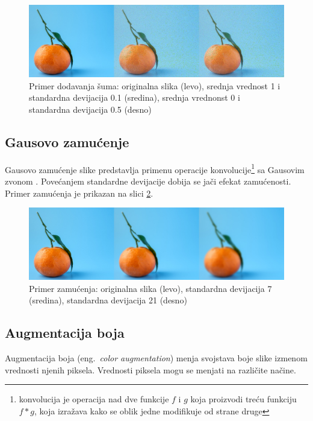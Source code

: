 \documentclass[12pt,oneside]{memoir}
\begin{document}
\begin{figure}[ht]
    \centering
    \includegraphics[width=1\textwidth]{matfmaster/glava3/noise.jpg}
    \caption{Primer dodavanja šuma:  originalna slika (levo), srednja vrednost 1 i standardna devijacija 0.1 (sredina), srednja vrednonst 0 i standardna devijacija 0.5 (desno) \cite{unsplashOrange}}
    \label{fig:section3_noise}
\end{figure}

\subsection{Gausovo zamućenje}
Gausovo zamućenje slike predstavlja primenu operacije konvolucije\footnote{konvolucija je operacija nad dve funkcije \(f\) i \(g\) koja proizvodi treću funkciju \(f*g\), koja izražava kako se oblik jedne modifikuje od strane druge} sa Gausovim zvonom \cite{ni2019}.
Povećanjem standardne devijacije dobija se jači efekat zamućenosti. Primer zamućenja je prikazan na slici \ref{fig:section3_blur}.


\begin{figure}[ht]
    \centering
    \includegraphics[width=1\textwidth]{matfmaster/glava3/blur.jpg}
    \caption{Primer zamućenja: originalna slika (levo), standardna devijacija 7 (sredina), standardna devijacija 21 (desno) \cite{unsplashOrange}} 
    \label{fig:section3_blur}
\end{figure}


\subsection{Augmentacija boja}

Augmentacija boja (eng.~\textit{color augmentation}) menja svojstava boje slike izmenom vrednosti njenih piksela. Vrednosti piksela mogu se menjati na različite načine.
\end{document}
